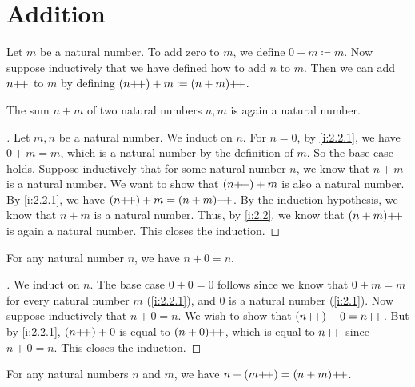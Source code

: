 \section{Addition}\label{i:sec:2.2}

\begin{defn}\label{i:2.2.1}
  Let \(m\) be a natural number.
  To add zero to \(m\), we define \(0 + m \coloneqq m\).
  Now suppose inductively that we have defined how to add \(n\) to \(m\).
  Then we can add \(n{+}\!{+}\) to \(m\) by defining \((n{+}\!{+}) + m \coloneqq (n + m){+}\!{+}\).
\end{defn}

\begin{ac}\label{i:ac:2.2.1}
  The sum \(n + m\) of two natural numbers \(n, m\) is again a natural number.
\end{ac}

\begin{proof}[]
  Let \(m, n\) be a natural number.
  We induct on \(n\).
  For \(n = 0\), by \cref{i:2.2.1}, we have \(0 + m = m\), which is a natural number by the definition of \(m\).
  So the base case holds.
  Suppose inductively that for some natural number \(n\), we know that \(n + m\) is a natural number.
  We want to show that \((n{+}\!{+}) + m\) is also a natural number.
  By \cref{i:2.2.1}, we have \((n{+}\!{+}) + m = (n + m){+}\!{+}\).
  By the induction hypothesis, we know that \(n + m\) is a natural number.
  Thus, by \cref{i:2.2}, we know that \((n + m){+}\!{+}\) is again a natural number.
  This closes the induction.
\end{proof}

\begin{lem}\label{i:2.2.2}
  For any natural number \(n\), we have \(n + 0 = n\).
\end{lem}

\begin{proof}[]
  We induct on \(n\).
  The base case \(0 + 0 = 0\) follows since we know that \(0 + m = m\) for every natural number \(m\) (\cref{i:2.2.1}), and \(0\) is a natural number (\cref{i:2.1}).
  Now suppose inductively that \(n + 0 = n\).
  We wish to show that \((n{+}\!{+}) + 0 = n{+}\!{+}\).
  But by \cref{i:2.2.1}, \((n{+}\!{+}) + 0\) is equal to \((n + 0){+}\!{+}\), which is equal to \(n{+}\!{+}\) since \(n + 0 = n\).
  This closes the induction.
\end{proof}

\begin{lem}\label{i:2.2.3}
  For any natural numbers \(n\) and \(m\), we have \(n + (m{+}\!{+}) = (n + m){+}\!{+}\).
\end{lem}

